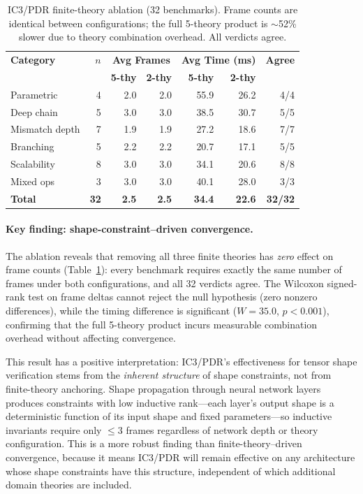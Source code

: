 \documentclass[11pt]{article}
\begin{document}
\begin{table}[t]
\centering
\caption{IC3/PDR finite-theory ablation (32 benchmarks).
  Frame counts are identical between configurations;
  the full 5-theory product is $\sim$52\% slower due to
  theory combination overhead.  All verdicts agree.}
\label{tab:ic3-ablation}
\small
\begin{tabular}{@{}lrrrrrr@{}}
\toprule
\textbf{Category} & \textbf{$n$} &
  \multicolumn{2}{c}{\textbf{Avg Frames}} &
  \multicolumn{2}{c}{\textbf{Avg Time (ms)}} &
  \textbf{Agree} \\
  & & \textbf{5-thy} & \textbf{2-thy} & \textbf{5-thy} & \textbf{2-thy} & \\
\midrule
Parametric      & 4 & 2.0 & 2.0 & 55.9 & 26.2 & 4/4 \\
Deep chain      & 5 & 3.0 & 3.0 & 38.5 & 30.7 & 5/5 \\
Mismatch depth  & 7 & 1.9 & 1.9 & 27.2 & 18.6 & 7/7 \\
Branching       & 5 & 2.2 & 2.2 & 20.7 & 17.1 & 5/5 \\
Scalability     & 8 & 3.0 & 3.0 & 34.1 & 20.6 & 8/8 \\
Mixed ops       & 3 & 3.0 & 3.0 & 40.1 & 28.0 & 3/3 \\
\midrule
\textbf{Total}  & \textbf{32} & \textbf{2.5} & \textbf{2.5} &
  \textbf{34.4} & \textbf{22.6} & \textbf{32/32} \\
\bottomrule
\end{tabular}
\end{table}

\paragraph{Key finding: shape-constraint--driven convergence.}
The ablation reveals that removing all three finite theories has
\emph{zero} effect on frame counts (Table~\ref{tab:ic3-ablation}):
every benchmark requires exactly the same number of frames under
both configurations, and all 32 verdicts agree.  The Wilcoxon signed-rank
test on frame deltas cannot reject the null hypothesis
(zero nonzero differences), while the timing difference is
significant ($W = 35.0$, $p < 0.001$), confirming that the full
5-theory product incurs measurable combination overhead without
affecting convergence.

This result has a positive interpretation: IC3/PDR's effectiveness
for tensor shape verification stems from the \emph{inherent structure}
of shape constraints, not from finite-theory anchoring.  Shape
propagation through neural network layers produces constraints with
low inductive rank---each layer's output shape is a deterministic
function of its input shape and fixed parameters---so inductive
invariants require only $\leq 3$ frames regardless of network depth
or theory configuration.  This is a more robust finding than
finite-theory--driven convergence, because it means IC3/PDR will
remain effective on any architecture whose shape constraints have
this structure, independent of which additional domain theories
are included.
\end{document}
